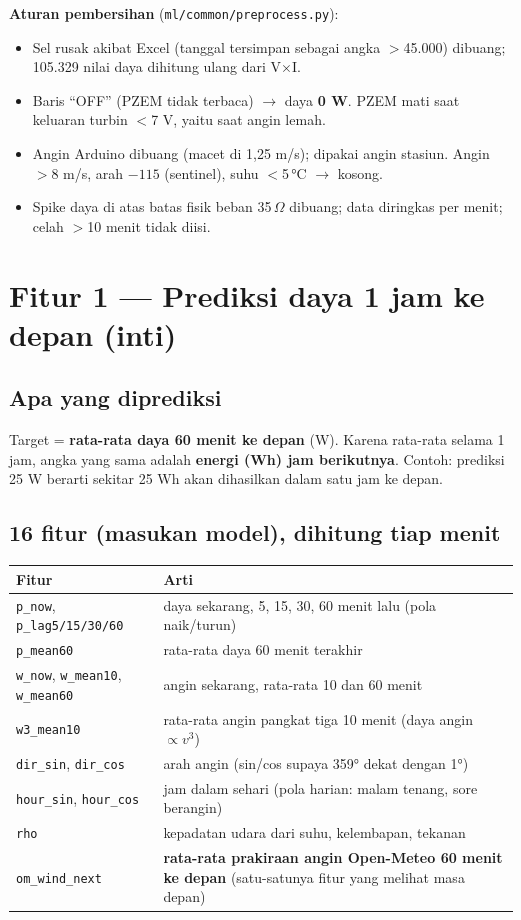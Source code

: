 \documentclass[10.5pt,a4paper]{article}
\newcommand{\cmd}[1]{\texttt{#1}}
\begin{document}
\textbf{Aturan pembersihan} (\cmd{ml/common/preprocess.py}):
\begin{itemize}
  \item Sel rusak akibat Excel (tanggal tersimpan sebagai angka $>$45.000) dibuang; 105.329 nilai daya dihitung ulang dari V$\times$I.
  \item Baris ``OFF'' (PZEM tidak terbaca) $\to$ daya \textbf{0 W}. PZEM mati saat keluaran turbin $<$7 V, yaitu saat angin lemah.
  \item Angin Arduino dibuang (macet di 1,25 m/s); dipakai angin stasiun. Angin $>$8 m/s, arah $-115$ (sentinel), suhu $<$5\,°C $\to$ kosong.
  \item Spike daya di atas batas fisik beban 35\,$\Omega$ dibuang; data diringkas per menit; celah $>$10 menit tidak diisi.
\end{itemize}

\section{Fitur 1 --- Prediksi daya 1 jam ke depan (inti)}
\subsection{Apa yang diprediksi}
Target = \textbf{rata-rata daya 60 menit ke depan} (W). Karena rata-rata selama 1 jam, angka yang sama adalah \textbf{energi (Wh) jam berikutnya}.
Contoh: prediksi 25 W berarti sekitar 25 Wh akan dihasilkan dalam satu jam ke depan.

\subsection{16 fitur (masukan model), dihitung tiap menit}
\begin{tabularx}{\linewidth}{@{}l X@{}}
\toprule
Fitur & Arti \\
\midrule
\cmd{p\_now}, \cmd{p\_lag5/15/30/60} & daya sekarang, 5, 15, 30, 60 menit lalu (pola naik/turun) \\
\cmd{p\_mean60} & rata-rata daya 60 menit terakhir \\
\cmd{w\_now}, \cmd{w\_mean10}, \cmd{w\_mean60} & angin sekarang, rata-rata 10 dan 60 menit \\
\cmd{w3\_mean10} & rata-rata angin pangkat tiga 10 menit (daya angin $\propto v^3$) \\
\cmd{dir\_sin}, \cmd{dir\_cos} & arah angin (sin/cos supaya 359° dekat dengan 1°) \\
\cmd{hour\_sin}, \cmd{hour\_cos} & jam dalam sehari (pola harian: malam tenang, sore berangin) \\
\cmd{rho} & kepadatan udara dari suhu, kelembapan, tekanan \\
\cmd{om\_wind\_next} & \textbf{rata-rata prakiraan angin Open-Meteo 60 menit ke depan} (satu-satunya fitur yang melihat masa depan) \\
\bottomrule
\end{tabularx}
\end{document}
